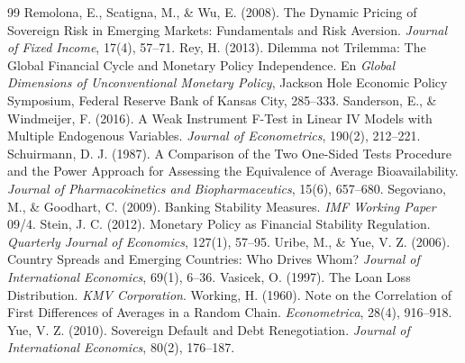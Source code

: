 \begin{thebibliography}{99}
 Remolona, E., Scatigna, M., \& Wu, E. (2008). The Dynamic Pricing of Sovereign Risk in Emerging Markets: Fundamentals and Risk Aversion. \textit{Journal of Fixed Income}, 17(4), 57--71.
 Rey, H. (2013). Dilemma not Trilemma: The Global Financial Cycle and Monetary Policy Independence. En \textit{Global Dimensions of Unconventional Monetary Policy}, Jackson Hole Economic Policy Symposium, Federal Reserve Bank of Kansas City, 285--333.
 Sanderson, E., \& Windmeijer, F. (2016). A Weak Instrument F-Test in Linear IV Models with Multiple Endogenous Variables. \textit{Journal of Econometrics}, 190(2), 212--221.
 Schuirmann, D. J. (1987). A Comparison of the Two One-Sided Tests Procedure and the Power Approach for Assessing the Equivalence of Average Bioavailability. \textit{Journal of Pharmacokinetics and Biopharmaceutics}, 15(6), 657--680.
 Segoviano, M., \& Goodhart, C. (2009). Banking Stability Measures. \textit{IMF Working Paper} 09/4.
 Stein, J. C. (2012). Monetary Policy as Financial Stability Regulation. \textit{Quarterly Journal of Economics}, 127(1), 57--95.
 Uribe, M., \& Yue, V. Z. (2006). Country Spreads and Emerging Countries: Who Drives Whom? \textit{Journal of International Economics}, 69(1), 6--36.
 Vasicek, O. (1997). The Loan Loss Distribution. \textit{KMV Corporation}.
 Working, H. (1960). Note on the Correlation of First Differences of Averages in a Random Chain. \textit{Econometrica}, 28(4), 916--918.
 Yue, V. Z. (2010). Sovereign Default and Debt Renegotiation. \textit{Journal of International Economics}, 80(2), 176--187.
\end{thebibliography}
